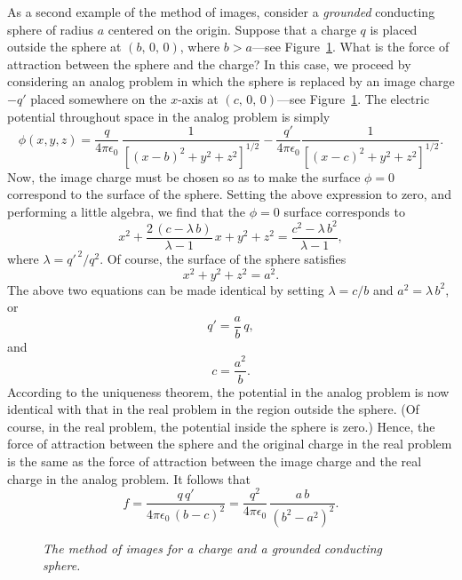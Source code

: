 As a second example of the method of images, consider a 
{\em grounded}\/ conducting sphere
of radius $a$ centered on the  origin. Suppose that a charge $q$ is
placed outside the sphere at $(b,\,0,\, 0)$, where $b>a$---see Figure~\ref{fimage1}. What is
the force of attraction between the sphere and the charge? In this case,
we proceed by considering an analog problem in which the sphere is replaced by an image charge $-q'$ placed
somewhere on the $x$-axis at $(c,\,0,\,0)$---see Figure~\ref{fimage1}. The electric potential throughout space in the
analog problem is simply
\begin{equation}
\phi(x,y,z) = \frac{q}{4\pi\epsilon_0}\,\frac{1}{[(x-b)^2+y^2+z^2]^{1/2}}-\frac{q'}{4\pi\epsilon_0}
\frac{1}{[(x-c)^2+y^2+z^2]^{1/2}}.
\end{equation}
Now, the image charge must be chosen so as to make the surface $\phi=0$ correspond to
the surface of the sphere. Setting the above expression to zero, and performing
a little algebra, we find that the $\phi=0$ surface corresponds to
\begin{equation}
x^2 + \frac{2\,(c-\lambda\,b)}{\lambda-1} \,x + y^2 + z^2 = \frac{c^2-\lambda\,b^2}{\lambda-1},
\end{equation}
where $\lambda=q'^{\,2}/q^2$. Of course, the surface of the sphere satisfies
\begin{equation}
x^2+y^2+z^2 = a^2.
\end{equation}
The above two equations can be made identical by setting $\lambda = c/b$ and $a^2=\lambda\,b^2$,
or
\begin{equation}
q' = \frac{a}{b}\,q,
\end{equation}
and
\begin{equation}
c = \frac{a^2}{b}.
\end{equation}
According to the uniqueness theorem, the potential in the analog problem is
now  identical with that in the real problem in the region outside the sphere. (Of course, in the real
problem, the potential inside the sphere is zero.)
Hence, the
force of attraction between the sphere and the original charge in the real problem
is the same as the force of attraction between the image charge and the real charge in the analog
problem. It follows that
\begin{equation}
f = \frac{q\,q'}{4\pi\epsilon_0\,(b-c)^2} = \frac{q^2}{4\pi\epsilon_0}\,\frac{a\,b}{(b^2-a^2)^2}.
\end{equation}
\begin{figure}
\epsfysize=2.25in
\centerline{}
\caption{\em The method of images for a charge and a grounded conducting sphere.}\label{fimage1}
\end{figure}

